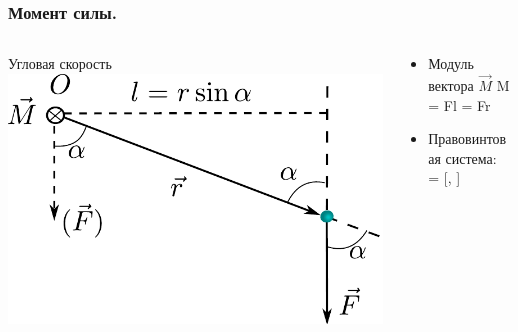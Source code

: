 \documentclass{beamer}
\begin{document}
\begin{frame}
\frametitle{Момент силы.}
\begin{columns}[t]
\begin{column}{0.40\linewidth}
\begin{block}{Угловая скорость}
\includegraphics[width=1\columnwidth]{mom_sil}
\end{block}
\end{column}

\begin{column}{0.40\linewidth}
\begin{itemize}
\item
Модуль вектора $\vec{M}$
\beq
M = Fl = Fr \sin \alpha
\eeq
\item
Правовинтовая система:
\beq
{} = [, ]
\eeq
\end{itemize}

\end{column}
\end{columns}
\end{frame}

\end{document}
